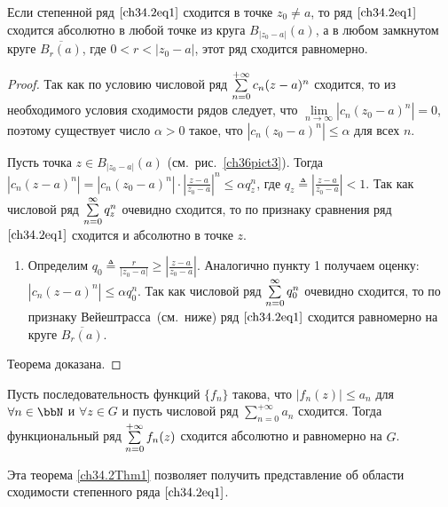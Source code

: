 \begin{thm}\label{ch34.2Thm1}
Если степенной ряд $\eqref{ch34.2eq1}$ сходится в точке $z_0 \not= a$, то ряд $\eqref{ch34.2eq1}$ сходится абсолютно в любой точке из круга $B_{|z_0 - a|}(a)$, а в любом замкнутом круге $\overline{B_{r}(a)}$, где $0 < r < |z_0 - a|$, этот ряд сходится равномерно.
\end{thm}
\begin{proof}
Так как по условию числовой ряд $\sum_{n = 0}^{+\infty}\limits c_n (z - a)^n$ сходится, то из необходимого условия сходимости рядов следует, что $\lim\limits_{n \to \infty} |c_n(z_0 - a)^n| = 0$, поэтому существует число $\alpha > 0$ такое, что $|c_n(z_0 - a)^n| \le \alpha$ для всех $n$.
\begin{enumerate}
 Пусть точка $z \in B_{|z_0 - a|}(a)$ (см.~рис.~\ref{ch36pict3}). Тогда $|c_n(z - a)^n| = |c_n(z_0 - a)^n| \cdot \left| \frac{z - a}{z_0 - a} \right|^n \le \alpha q^{n}_z$, где $q_z \triangleq \left| \frac{z - a}{z_0 - a} \right| < 1$. Так как числовой ряд $\sum_{n = 0}^{\infty}\limits q_{z}^n$ очевидно сходится, то по признаку сравнения ряд $\eqref{ch34.2eq1}$ сходится и абсолютно в точке $z$.
\end{enumerate}\vspace*{0\baselineskip}\begin{enumerate}[resume*]
\item Определим $q_0 \triangleq \frac{r}{|z_0 - a|}\ge\left|\frac{z - a}{z_0 - a}\right|$. Аналогично пункту 1 получаем оценку: $|c_n(z - a)^n| \le \alpha q^{n}_0$. Так как числовой ряд $\sum_{n = 0}^{\infty}\limits q_{0}^n$ очевидно сходится, то по признаку Вейештрасса~(см.~ниже) ряд $\eqref{ch34.2eq1}$ сходится равномерно на круге $\overline{B_{r}(a)}$.
\end{enumerate}

\EndInsert
Теорема доказана.
\end{proof}

\begin{stt}
Пусть последовательность функций $\{f_n\}$ такова, что $|f_n(z)| \le a_n$ для $\forall n \in \bbN$ и $\forall z \in G$ и пусть числовой ряд $\sum\limits_{n = 0}^{+\infty} a_n$ сходится. Тогда функциональный ряд $\sum_{n = 0}^{+\infty}\limits f_n(z)$ сходится абсолютно и равномерно на $G$. 
\end{stt}

Эта теорема \ref{ch34.2Thm1} позволяет получить представление об области сходимости степенного ряда $\eqref{ch34.2eq1}$.

